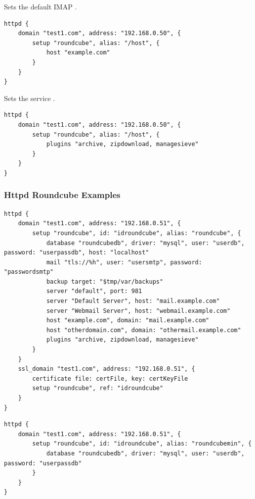 Sets the default IMAP .

\begin{lstlisting}[style=Java]
httpd {
    domain "test1.com", address: "192.168.0.50", {
        setup "roundcube", alias: "/host", {
            host "example.com"
        }
    }
}
\end{lstlisting}


Sets the service .

\begin{lstlisting}[style=Java]
httpd {
    domain "test1.com", address: "192.168.0.50", {
        setup "roundcube", alias: "/host", {
            plugins "archive, zipdownload, managesieve"
        }
    }
}
\end{lstlisting}

\subsubsection{Httpd Roundcube Examples}

\begin{lstlisting}[style=Sscontrol,
label={lst:roundcube_example_script_base},
title={Installs the Roundcube service in the speciefied domain.}]
httpd {
    domain "test1.com", address: "192.168.0.51", {
        setup "roundcube", id: "idroundcube", alias: "roundcube", {
            database "roundcubedb", driver: "mysql", user: "userdb", password: "userpassdb", host: "localhost"
            mail "tls://%h", user: "usersmtp", password: "passwordsmtp"
            backup target: "$tmp/var/backups"
            server "default", port: 981
            server "Default Server", host: "mail.example.com"
            server "Webmail Server", host: "webmail.example.com"
            host "example.com", domain: "mail.example.com"
            host "otherdomain.com", domain: "othermail.example.com"
            plugins "archive, zipdownload, managesieve"
        }
    }
    ssl_domain "test1.com", address: "192.168.0.51", {
        certificate file: certFile, key: certKeyFile
        setup "roundcube", ref: "idroundcube"
    }
}
\end{lstlisting}

\begin{lstlisting}[style=Sscontrol,
label={lst:roundcube_example_script_minimal},
title={Installs the Roundcube service in the speciefied domain with minimal configuration.}]
httpd {
    domain "test1.com", address: "192.168.0.51", {
        setup "roundcube", id: "idroundcube", alias: "roundcubemin", {
            database "roundcubedb", driver: "mysql", user: "userdb", password: "userpassdb"
        }
    }
}
\end{lstlisting}

